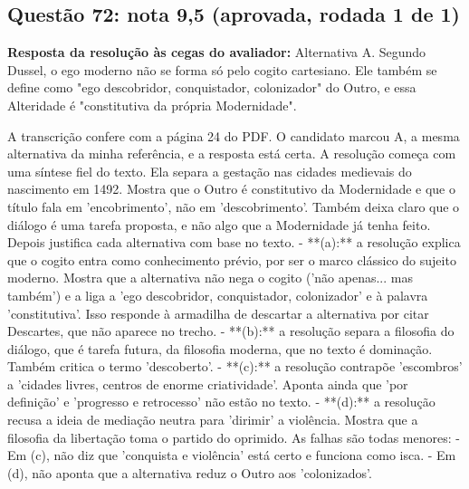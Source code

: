 \documentclass{article}%
\begin{document}
\subsection*{Questão 72: nota 9,5 (aprovada, rodada 1 de 1)}%
\textbf{Resposta da resolução às cegas do avaliador:} Alternativa A. Segundo Dussel, o ego moderno não se forma só pelo cogito cartesiano. Ele também se define como "ego descobridor, conquistador, colonizador" do Outro, e essa Alteridade é "constitutiva da própria Modernidade".\par %
A transcrição confere com a página 24 do PDF. O candidato marcou A, a mesma alternativa da minha referência, e a resposta está certa.\newline%
\newline%
A resolução começa com uma síntese fiel do texto. Ela separa a gestação nas cidades medievais do nascimento em 1492. Mostra que o Outro é constitutivo da Modernidade e que o título fala em 'encobrimento', não em 'descobrimento'. Também deixa claro que o diálogo é uma tarefa proposta, e não algo que a Modernidade já tenha feito. Depois justifica cada alternativa com base no texto.\newline%
\newline%
{-} **(a):** a resolução explica que o cogito entra como conhecimento prévio, por ser o marco clássico do sujeito moderno. Mostra que a alternativa não nega o cogito ('não apenas... mas também') e a liga a 'ego descobridor, conquistador, colonizador' e à palavra 'constitutiva'. Isso responde à armadilha de descartar a alternativa por citar Descartes, que não aparece no trecho.\newline%
{-} **(b):** a resolução separa a filosofia do diálogo, que é tarefa futura, da filosofia moderna, que no texto é dominação. Também critica o termo 'descoberto'.\newline%
{-} **(c):** a resolução contrapõe 'escombros' a 'cidades livres, centros de enorme criatividade'. Aponta ainda que 'por definição' e 'progresso e retrocesso' não estão no texto.\newline%
{-} **(d):** a resolução recusa a ideia de mediação neutra para 'dirimir' a violência. Mostra que a filosofia da libertação toma o partido do oprimido.\newline%
\newline%
As falhas são todas menores:\newline%
{-} Em (c), não diz que 'conquista e violência' está certo e funciona como isca.\newline%
{-} Em (d), não aponta que a alternativa reduz o Outro aos 'colonizados'.\newline%
\end{document}
